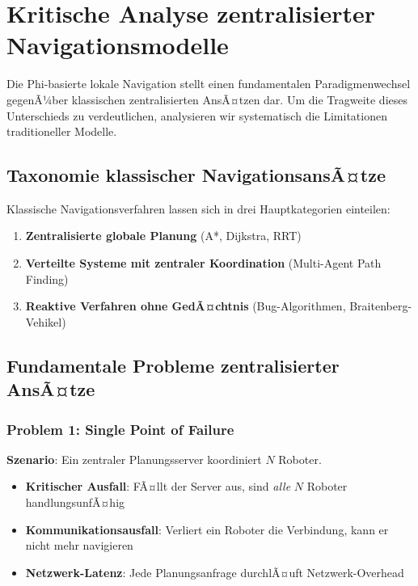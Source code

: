 ﻿\documentclass[a4paper,12pt]{article}
\theoremstyle{definition}
\begin{document}
\section{Kritische Analyse zentralisierter Navigationsmodelle}

Die Phi-basierte lokale Navigation stellt einen fundamentalen Paradigmenwechsel gegenÃ¼ber klassischen zentralisierten AnsÃ¤tzen dar. Um die Tragweite dieses Unterschieds zu verdeutlichen, analysieren wir systematisch die Limitationen traditioneller Modelle.

\subsection{Taxonomie klassischer NavigationsansÃ¤tze}

Klassische Navigationsverfahren lassen sich in drei Hauptkategorien einteilen:

\begin{enumerate}
	\item \textbf{Zentralisierte globale Planung} (A*, Dijkstra, RRT)
	\item \textbf{Verteilte Systeme mit zentraler Koordination} (Multi-Agent Path Finding)
	\item \textbf{Reaktive Verfahren ohne GedÃ¤chtnis} (Bug-Algorithmen, Braitenberg-Vehikel)
\end{enumerate}

\subsection{Fundamentale Probleme zentralisierter AnsÃ¤tze}

\subsubsection{Problem 1: Single Point of Failure}

\textbf{Szenario}: Ein zentraler Planungsserver koordiniert $N$ Roboter.

\begin{itemize}
	\item \textbf{Kritischer Ausfall}: FÃ¤llt der Server aus, sind \emph{alle} $N$ Roboter handlungsunfÃ¤hig
	\item \textbf{Kommunikationsausfall}: Verliert ein Roboter die Verbindung, kann er nicht mehr navigieren
	\item \textbf{Netzwerk-Latenz}: Jede Planungsanfrage durchlÃ¤uft Netzwerk-Overhead
\end{itemize}
\end{document}
